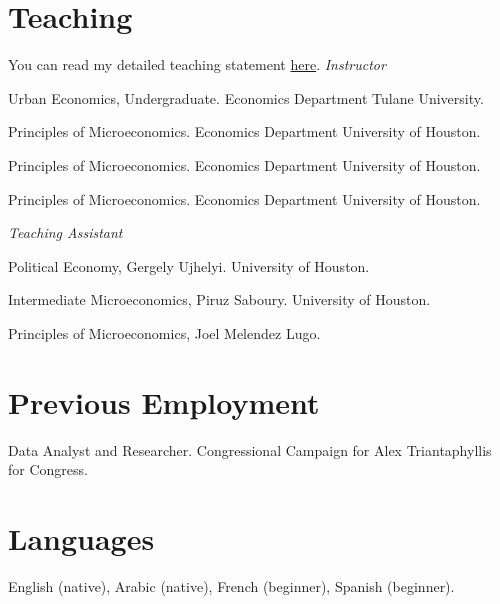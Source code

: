 \documentclass[letterpaper]{article}
\renewenvironment{itemize}{
  \begin{list}{}{
    \setlength{\leftmargin}{1.5em}
  }
}{
  \end{list}
}
\begin{document}
\vspace{2 mm}

\section*{Teaching}
\vspace{2 mm}
You can read my detailed teaching statement \href{https://hhadah.github.io/statements/Hadah_Teaching.pdf}{here}.
\textit{Instructor}
\begin{itemize}
\item {}Urban Economics, Undergraduate. Economics Department Tulane University.
\item {}Principles of Microeconomics. Economics Department University of Houston.
\item {}Principles of Microeconomics. Economics Department University of Houston.
\item {}Principles of Microeconomics. Economics Department University of Houston.

\end{itemize}
\textit{Teaching Assistant}
\begin{itemize}
\item {}Political Economy, Gergely Ujhelyi. University of Houston.
\item {}Intermediate Microeconomics, Piruz Saboury. University of Houston.
\item {}Principles of Microeconomics, Joel Melendez Lugo.

\end{itemize}
\vspace{2 mm}


\section*{Previous Employment}
\vspace{2 mm}
\begin{itemize}
\item {}Data Analyst and Researcher. Congressional Campaign for Alex Triantaphyllis for Congress.
\end{itemize}
\vspace{2 mm}

\section*{Languages}
\vspace{2 mm}
{\makebox[2.3cm]{\hfill}}English (native), Arabic (native), French (beginner), Spanish (beginner).
\vspace{2 mm}
\end{document}
